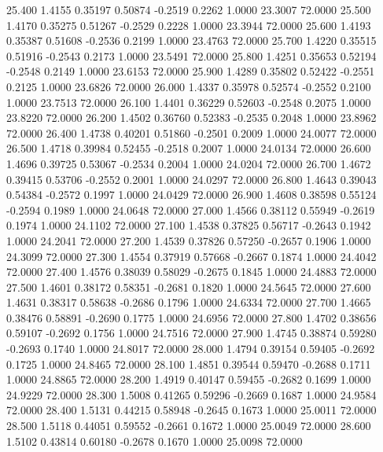   25.400   1.4155   0.35197   0.50874  -0.2519   0.2262   1.0000  23.3007  72.0000
  25.500   1.4170   0.35275   0.51267  -0.2529   0.2228   1.0000  23.3944  72.0000
  25.600   1.4193   0.35387   0.51608  -0.2536   0.2199   1.0000  23.4763  72.0000
  25.700   1.4220   0.35515   0.51916  -0.2543   0.2173   1.0000  23.5491  72.0000
  25.800   1.4251   0.35653   0.52194  -0.2548   0.2149   1.0000  23.6153  72.0000
  25.900   1.4289   0.35802   0.52422  -0.2551   0.2125   1.0000  23.6826  72.0000
  26.000   1.4337   0.35978   0.52574  -0.2552   0.2100   1.0000  23.7513  72.0000
  26.100   1.4401   0.36229   0.52603  -0.2548   0.2075   1.0000  23.8220  72.0000
  26.200   1.4502   0.36760   0.52383  -0.2535   0.2048   1.0000  23.8962  72.0000
  26.400   1.4738   0.40201   0.51860  -0.2501   0.2009   1.0000  24.0077  72.0000
  26.500   1.4718   0.39984   0.52455  -0.2518   0.2007   1.0000  24.0134  72.0000
  26.600   1.4696   0.39725   0.53067  -0.2534   0.2004   1.0000  24.0204  72.0000
  26.700   1.4672   0.39415   0.53706  -0.2552   0.2001   1.0000  24.0297  72.0000
  26.800   1.4643   0.39043   0.54384  -0.2572   0.1997   1.0000  24.0429  72.0000
  26.900   1.4608   0.38598   0.55124  -0.2594   0.1989   1.0000  24.0648  72.0000
  27.000   1.4566   0.38112   0.55949  -0.2619   0.1974   1.0000  24.1102  72.0000
  27.100   1.4538   0.37825   0.56717  -0.2643   0.1942   1.0000  24.2041  72.0000
  27.200   1.4539   0.37826   0.57250  -0.2657   0.1906   1.0000  24.3099  72.0000
  27.300   1.4554   0.37919   0.57668  -0.2667   0.1874   1.0000  24.4042  72.0000
  27.400   1.4576   0.38039   0.58029  -0.2675   0.1845   1.0000  24.4883  72.0000
  27.500   1.4601   0.38172   0.58351  -0.2681   0.1820   1.0000  24.5645  72.0000
  27.600   1.4631   0.38317   0.58638  -0.2686   0.1796   1.0000  24.6334  72.0000
  27.700   1.4665   0.38476   0.58891  -0.2690   0.1775   1.0000  24.6956  72.0000
  27.800   1.4702   0.38656   0.59107  -0.2692   0.1756   1.0000  24.7516  72.0000
  27.900   1.4745   0.38874   0.59280  -0.2693   0.1740   1.0000  24.8017  72.0000
  28.000   1.4794   0.39154   0.59405  -0.2692   0.1725   1.0000  24.8465  72.0000
  28.100   1.4851   0.39544   0.59470  -0.2688   0.1711   1.0000  24.8865  72.0000
  28.200   1.4919   0.40147   0.59455  -0.2682   0.1699   1.0000  24.9229  72.0000
  28.300   1.5008   0.41265   0.59296  -0.2669   0.1687   1.0000  24.9584  72.0000
  28.400   1.5131   0.44215   0.58948  -0.2645   0.1673   1.0000  25.0011  72.0000
  28.500   1.5118   0.44051   0.59552  -0.2661   0.1672   1.0000  25.0049  72.0000
  28.600   1.5102   0.43814   0.60180  -0.2678   0.1670   1.0000  25.0098  72.0000
